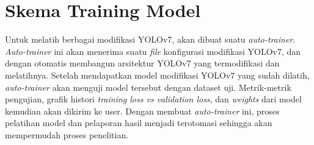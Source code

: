 \section{Skema Training Model}
  Untuk melatih berbagai modifikasi YOLOv7, akan dibuat suatu \emph{auto-trainer}.
  \emph{Auto-trainer} ini akan menerima suatu \emph{file} konfigurasi modifikasi YOLOv7, dan dengan otomatis membangun arsitektur YOLOv7 yang termodifikasi dan melatihnya.
  Setelah mendapatkan model modifikasi YOLOv7 yang sudah dilatih, \emph{auto-trainer} akan menguji model tersebut dengan dataset uji.
  Metrik-metrik pengujian, grafik histori \emph{training loss vs validation loss}, dan \emph{weights} dari model kemudian akan dikirim ke user.
  Dengan membuat \emph{auto-trainer} ini, proses pelatihan model dan pelaporan hasil menjadi terotomasi sehingga akan mempermudah proses penelitian.
